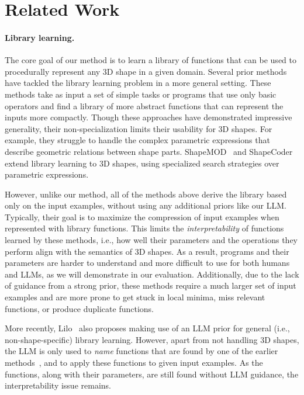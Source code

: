 \section{Related Work}

\paragraph{Library learning.}

The core goal of our method is to learn a library of functions that can be used to procedurally represent any 3D shape in a given domain. Several prior methods~\cite{ellis2018library, ellis2021dreamcoder, topdownlib, babble, bellur2024leroy} have tackled the library learning problem in a more general setting. These methods take as input a set of simple tasks or programs that use only basic operators and find a library of more abstract functions that can represent the inputs more compactly.
Though these approaches have demonstrated impressive generality, their non-specialization limits their usability for 3D shapes. 
For example, they struggle to handle the complex parametric expressions that describe geometric relations between shape parts.
ShapeMOD~\cite{jones2021shapeMOD} and ShapeCoder~\cite{jones2023shapecoder} extend library learning to 3D shapes, using specialized search strategies over parametric expressions.

However, unlike our method, all of the methods above derive the library based only on the input examples, without using any additional priors like our LLM. Typically, their goal is to maximize the compression of input examples when represented with library functions. This limits the \emph{interpretability} of functions learned by these methods, i.e., how well their parameters and the operations they perform align with the semantics of 3D shapes. As a result, programs and their parameters are harder to understand and more difficult to use for both humans and LLMs, as we will demonstrate in our evaluation. Additionally, due to the lack of guidance from a strong prior, these methods require a much larger set of input examples and are more prone to get stuck in local minima, miss relevant functions, or produce duplicate functions.

More recently, Lilo~\cite{grand2024lilo} also proposes making use of an LLM prior for general (i.e., non-shape-specific) library learning. However, apart from not handling 3D shapes, the LLM is only used to \emph{name} functions that are found by one of the earlier methods~\cite{topdownlib}, and to apply these functions to given input examples. As the functions, along with their parameters, are still found without LLM guidance, the interpretability issue remains.


